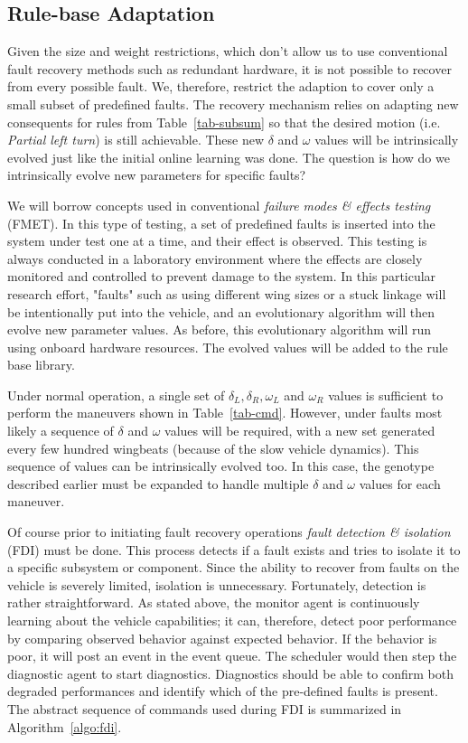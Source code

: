 \subsection{Rule-base Adaptation}
\label{subsec-FaultDetection}
Given the size and weight restrictions, which don’t allow us to use conventional fault recovery methods such as redundant hardware, it is not possible to recover from every possible fault. We, therefore, restrict the adaption to cover only a small subset of predefined faults. The recovery mechanism relies on adapting new consequents for rules from Table~\ref{tab-subsum} so that the desired motion (i.e. \textit{Partial left turn}) is still achievable. These new $\delta$ and $\omega$ values will be intrinsically evolved just like the initial online learning was done. The question is how do we intrinsically evolve new parameters for specific faults?

We will borrow concepts used in conventional \textit{failure modes \& effects testing} (FMET). In this type of testing, a set of predefined faults is inserted into the system under test one at a time, and their effect is observed. This testing is always conducted in a laboratory environment where the effects are closely monitored and controlled to prevent damage to the system. In this particular research effort, "faults" such as using different wing sizes or a stuck linkage will be intentionally put into the vehicle, and an evolutionary algorithm will then evolve new parameter values. As before, this evolutionary algorithm will run using onboard hardware resources. The evolved values will be added to the rule base library.

Under normal operation, a single set of $\delta_L, \delta_R, \omega_L$ and $\omega_R$ values is sufficient to perform the maneuvers shown in Table~\ref{tab-cmd}. However, under faults most likely a sequence of $\delta$ and $\omega$ values will be required, with a new set generated every few hundred wingbeats (because of the slow vehicle dynamics). This sequence of values can be intrinsically evolved too. In this case, the genotype described earlier must be expanded to handle multiple $\delta$ and $\omega$ values for each maneuver.

Of course prior to initiating fault recovery operations \textit{fault detection \& isolation} (FDI) must be done. This process detects if a fault exists and tries to isolate it to a specific subsystem or component. Since the ability to recover from faults on the vehicle is severely limited, isolation is unnecessary. Fortunately, detection is rather straightforward. As stated above, the monitor agent is continuously learning about the vehicle capabilities; it can, therefore, detect poor performance by comparing observed behavior against expected behavior. If the behavior is poor, it will post an event in the event queue. The scheduler would then step the diagnostic agent to start diagnostics. Diagnostics should be able to confirm both degraded performances and identify which of the pre-defined faults is present. The abstract sequence of commands used during FDI is summarized in Algorithm~\ref{algo:fdi}.

